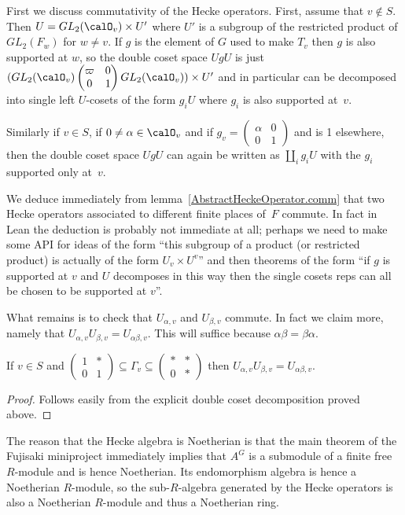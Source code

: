 First we discuss commutativity of the Hecke operators. First, assume that $v\not\in S$.
Then $U=GL_2(\calO_v)\times U'$ where $U'$ is a subgroup of the restricted product
of $GL_2(F_w)$ for $w\not=v$. If $g$ is the element of $G$ used to make $T_v$ then
$g$ is also supported at $w$, so the double coset space $UgU$ is just
$(GL_2(\calO_v)\begin{pmatrix}\varpi&0\\0&1\end{pmatrix}GL_2(\calO_v))\times U'$
and in particular can be decomposed into single left $U$-cosets of the form $g_iU$
where $g_i$ is also supported at~$v$.

Similarly if $v\in S$, if $0\not=\alpha\in\calO_v$ and if $g_v=\begin{pmatrix}\alpha&0\\0&1\end{pmatrix}$
and is 1 elsewhere, then the double coset space $UgU$ can again be written as $\coprod_i g_iU$
with the $g_i$ supported only at~$v$.

We deduce immediately from lemma~\ref{AbstractHeckeOperator.comm} that two Hecke operators
associated to different finite places of~$F$ commute. In fact in Lean the deduction is probably
not immediate at all; perhaps we need to make some API for ideas of the form ``this subgroup
of a product (or restricted product) is actually of the form $U_v \times U^v$'' and then
theorems of the form ``if $g$ is supported at $v$ and $U$ decomposes in this way then
the single cosets reps can all be chosen to be supported at $v$''.

What remains is to check that $U_{\alpha,v}$ and $U_{\beta,v}$ commute. In fact we claim
more, namely that $U_{\alpha,v}U_{\beta,v}=U_{\alpha\beta,v}$. This will suffice
because $\alpha\beta=\beta\alpha$.

\begin{lemma} If $v\in S$ and $\begin{pmatrix}1&*\\0&1\end{pmatrix}\subseteq\Gamma_v\subseteq\begin{pmatrix}*&*\\0&*\end{pmatrix}$
  then $U_{\alpha,v}U_{\beta,v}=U_{\alpha\beta,v}$.
\end{lemma}
\begin{proof} Follows easily from the explicit double coset decomposition proved above.
\end{proof}

The reason that the Hecke algebra is Noetherian is that the main theorem of the Fujisaki
miniproject immediately implies that $A^G$ is a submodule of a finite free $R$-module
and is hence Noetherian. Its endomorphism algebra is hence a Noetherian $R$-module,
so the sub-$R$-algebra generated by the Hecke operators is also a Noetherian $R$-module
and thus a Noetherian ring.
